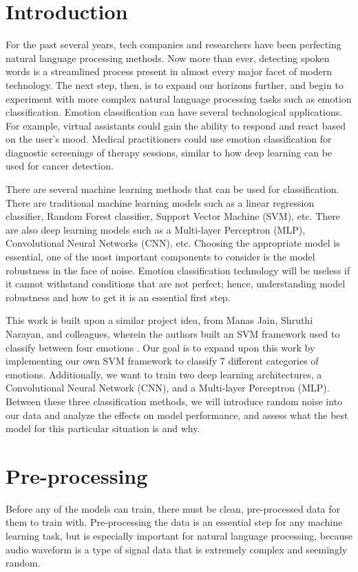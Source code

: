 \documentclass[12pt]{article}
\begin{document}
\begin{multicols*}{2}

\section*{Introduction}
For the past several years, tech companies and researchers have been perfecting natural language processing methods.
Now more than ever, detecting spoken words is a streamlined process present in almost every major facet of modern technology.
The next step, then, is to expand our horizons further, and begin to experiment with more complex natural language processing tasks such as emotion classification.
Emotion classification can have several technological applications.
For example, virtual assistants could gain the ability to respond and react based on the user's mood.
Medical practitioners could use emotion classification for diagnostic screenings of therapy sessions, similar to how deep learning can be used for cancer detection.

There are several machine learning methods that can be used for classification.
There are traditional machine learning models such as a linear regression classifier, Random Forest classifier, Support Vector Machine (SVM), etc.
There are also deep learning models such as a Multi-layer Perceptron (MLP), Convolutional Neural Networks (CNN), etc.
Choosing the appropriate model is essential, one of the most important components to consider is the model robustness in the face of noise.
Emotion classification technology will be useless if it cannot withstand conditions that are not perfect; hence, understanding model robustness and how to get it is an essential first step.

This work is built upon a similar project idea, from Manas Jain, Shruthi Narayan, and colleagues, wherein the authors built an SVM framework used to classify between four emotions \cite{jain2020speech}.
Our goal is to expand upon this work by implementing our own SVM framework to classify 7 different categories of emotions.
Additionally, we want to train two deep learning architectures, a Convolutional Neural Network (CNN), and a Multi-layer Perceptron (MLP).
Between these three classification methods, we will introduce random noise into our data and analyze the effects on model performance, and assess what the best model for this particular situation is and why.

\section*{Pre-processing}
Before any of the models can train, there must be clean, pre-processed data for them to train with.
Pre-processing the data is an essential step for any machine learning task, but is especially important for natural language processing, because audio waveform is a type of signal data that is extremely complex and seemingly random.


\end{multicols*}
\end{document}
